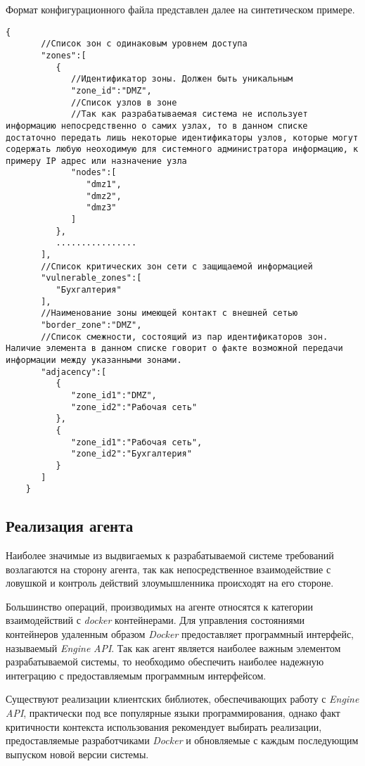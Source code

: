 Формат конфигурационного файла представлен далее на синтетическом примере.

\begin{lstlisting}[style=gostyle, label=lst:crossover]
	{  
	   //Список зон с одинаковым уровнем доступа
	   "zones":[  
	      {  
	         //Идентификатор зоны. Должен быть уникальным
	         "zone_id":"DMZ",
	         //Список узлов в зоне
	         //Так как разрабатываемая система не использует информацию непосредственно о самих узлах, то в данном списке достаточно передать лишь некоторые идентификаторы узлов, которые могут содержать любую неоходимую для системного администратора информацию, к примеру IP адрес или назначение узла
	         "nodes":[  
	            "dmz1",
	            "dmz2",
	            "dmz3"
	         ]
	      },
	      ................
	   ],
	   //Список критических зон сети с защищаемой информацией
	   "vulnerable_zones":[  
	      "Бухгалтерия"
	   ],
	   //Наименование зоны имеющей контакт с внешней сетью
	   "border_zone":"DMZ",
	   //Список смежности, состоящий из пар идентификаторов зон. Наличие элемента в данном списке говорит о факте возможной передачи информации между указанными зонами.
	   "adjacency":[  
	      {  
	         "zone_id1":"DMZ",
	         "zone_id2":"Рабочая сеть"
	      },
	      {  
	         "zone_id1":"Рабочая сеть",
	         "zone_id2":"Бухгалтерия"
	      }
	   ]
	}
\end{lstlisting}


\subsection{Реализация агента}

Наиболее значимые из выдвигаемых к разрабатываемой системе требований возлагаются на сторону агента, так как непосредственное взаимодействие с ловушкой и контроль действий злоумышленника происходят на его стороне.

Большинство операций, производимых на агенте относятся к категории взаимодействий с \textit{docker} контейнерами. Для управления состояниями контейнеров удаленным образом \textit{Docker} предоставляет программный интерфейс, называемый \textit{Engine} \textit{API}. Так как агент является наиболее важным элементом разрабатываемой системы, то необходимо обеспечить наиболее надежную интеграцию с предоставляемым программным интерфейсом.

Существуют реализации клиентских библиотек, обеспечивающих работу с \textit{Engine API}, практически под все популярные языки программирования, однако факт критичности контекста использования рекомендует выбирать реализации, предоставляемые разработчиками \textit{Docker} и обновляемые с каждым последующим выпуском новой версии системы.

